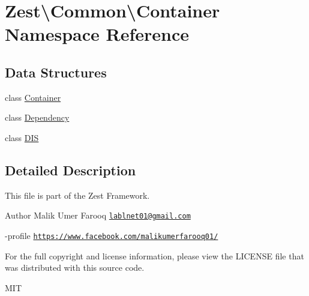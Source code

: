 \hypertarget{namespace_zest_1_1_common_1_1_container}{}\section{Zest\textbackslash{}Common\textbackslash{}Container Namespace Reference}
\label{namespace_zest_1_1_common_1_1_container}
\subsection*{Data Structures}
\begin{DoxyCompactItemize}
\item 
class \mbox{\hyperlink{class_zest_1_1_common_1_1_container_1_1_container}{Container}}
\item 
class \mbox{\hyperlink{class_zest_1_1_common_1_1_container_1_1_dependency}{Dependency}}
\item 
class \mbox{\hyperlink{class_zest_1_1_common_1_1_container_1_1_d_i_s}{D\+IS}}
\end{DoxyCompactItemize}


\subsection{Detailed Description}
This file is part of the Zest Framework.

\begin{DoxyAuthor}{Author}
Malik Umer Farooq \href{mailto:lablnet01@gmail.com}{\tt lablnet01@gmail.\+com} 

-\/profile \href{https://www.facebook.com/malikumerfarooq01/}{\tt https\+://www.\+facebook.\+com/malikumerfarooq01/}
\end{DoxyAuthor}
For the full copyright and license information, please view the L\+I\+C\+E\+N\+SE file that was distributed with this source code.

M\+IT 